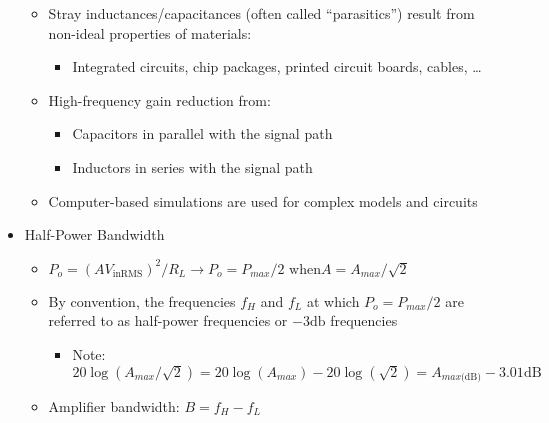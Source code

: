\begin{itemize}
\begin{itemize}
      \item Stray inductances/capacitances (often called ``parasitics'') result from non-ideal properties of materials:

        \begin{itemize}

          \item Integrated circuits, chip packages, printed circuit boards, cables, \ldots

        \end{itemize}

      \item High-frequency gain reduction from:

        \begin{itemize}

          \item Capacitors in parallel with the signal path

          \item Inductors in series with the signal path

        \end{itemize}

      \item Computer-based simulations are used for complex models and circuits

    \end{itemize}

  \item Half-Power Bandwidth

    \begin{itemize}

      \item $P_o=(AV_{\text{inRMS}})^2/R_L\to P_o=P_{max}/2\text{ when} A=A_{max}/\sqrt{2}$

      \item By convention, the frequencies $f_H$ and $f_L$ at which $P_o=P_{max}/2$ are referred to as half-power frequencies or $-3\text{db}$ frequencies

        \begin{itemize}

          \item Note: $20\log(A_{max}/\sqrt{2})=20\log(A_{max})-20\log(\sqrt{2})=A_{max\text{(dB)}}-3.01\text{dB}$

        \end{itemize}

      \item Amplifier bandwidth: $B=f_H-f_L$

    \end{itemize}

\end{itemize}




